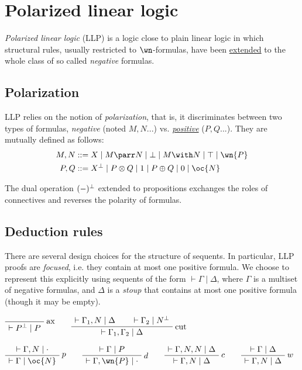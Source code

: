 \chapter{Polarized linear logic}\label{polarized-linear-logic}

\emph{Polarized linear logic} (LLP) is a logic close to plain linear
logic in which structural rules, usually restricted to \(\wn\)-formulas,
have been \hyperref[generalized-structural-rules-pos]{extended} to the
whole class of so called \emph{negative} formulas.

\section{Polarization}\label{polarization}

LLP relies on the notion of \emph{polarization}, that is, it
discriminates between two types of formulas, \emph{negative} (noted
\(M, N...\)) vs. \emph{\hyperref[positive-formula]{positive}} (\(P, Q...\)).
They are mutually defined as follows:
\begin{align*}
M, N &::= X \mid M \parr N \mid \bot \mid M \with N \mid \top \mid \wn{P} \\
P, Q &::= X\orth \mid P \otimes Q \mid 1 \mid P \oplus Q \mid 0 \mid \oc{N}
\end{align*}

The dual operation \((-)^\bot\) extended to propositions exchanges the
roles of connectives and reverses the polarity of formulas.

\section{Deduction rules}\label{deduction-rules}

There are several design choices for the structure of sequents. In
particular, LLP proofs are \emph{focused}, i.e. they contain at most
one positive formula. We choose to represent this explicitly using
sequents of the form \(\vdash\Gamma\mid\Delta\), where \(\Gamma\) is a
multiset of negative formulas, and \(\Delta\) is a \emph{stoup} that
contains at most one positive formula (though it may be empty).

\(\LabelRule{\rulename{ax}}
\NulRule{\vdash P\orth \mid P}
\DisplayProof
\qquad
\AxRule{\vdash \Gamma_1, N \mid \Delta}
\AxRule{\vdash \Gamma_2 \mid N\orth}
\LabelRule{\rulename{cut}}
\BinRule{\vdash\Gamma_1, \Gamma_2 \mid \Delta}
\DisplayProof\)

\(\AxRule{\vdash\Gamma, N\mid\cdot}
\LabelRule{p}
\UnaRule{\vdash\Gamma\mid \oc{N}}
\DisplayProof
\qquad
\AxRule{\vdash\Gamma\mid P}
\LabelRule{d}
\UnaRule{\vdash\Gamma,\wn{P}\mid \cdot}
\DisplayProof
\qquad
\AxRule{\vdash\Gamma,N,N\mid \Delta}
\LabelRule{c}
\UnaRule{\vdash\Gamma, N\mid\Delta}
\DisplayProof
\qquad
\AxRule{\vdash\Gamma\mid \Delta}
\LabelRule{w}
\UnaRule{\vdash\Gamma,N\mid\Delta}
\DisplayProof\)

